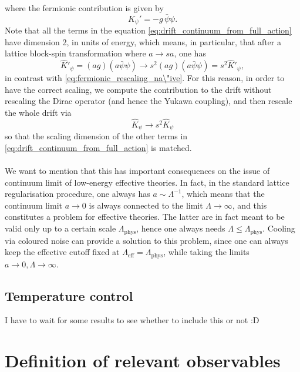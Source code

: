where the fermionic contribution is given by
\begin{equation*}
    K_{\psi}' = - g \, \bar\psi\psi.
\end{equation*}
Note that all the terms in the equation \eqref{eq:drift_continuum_from_full_action} have dimension 2, in units of energy, which means, in particular, that after a lattice block-spin transformation where $a \to sa$, one has
\begin{equation}
    \widehat{K}'_\psi = (ag) (a\bar\psi \psi) \to s^2 (ag) (a\bar\psi \psi) = s^2 \widehat{K}'_\psi,
    \label{eq:rescaling_blinear}
\end{equation}
in contrast with \eqref{eq:fermionic_rescaling_na\"ive}. For this reason, in order to have the correct scaling, we compute the contribution to the drift without rescaling the Dirac operator (and hence the Yukawa coupling), and then rescale the whole drift via 
\begin{equation*}
    \widehat{K}_\psi \to s^2 \widehat{K}_\psi
\end{equation*}
so that the scaling dimension of the other terms in \eqref{eq:drift_continuum_from_full_action} is matched. \\~\\
We want to mention that this has important consequences on the issue of continuum limit of low-energy effective theories. In fact, in the standard lattice regularisation procedure, one always has $a \sim \Lambda^{-1}$, which means that the continuum limit $a \to 0$ is always connected to the limit $\Lambda \to \infty$, and this constitutes a problem for effective theories. The latter are in fact meant to be valid only up to a certain scale $\Lambda_\text{phys}$, hence one always needs $\Lambda \leq \Lambda_\text{phys}$. Cooling via coloured noise can provide a solution to this problem, since one can always keep the effective cutoff fixed at $\Lambda_\text{eff} = \Lambda_\text{phys}$, while taking the limits $a \to 0, \Lambda \to \infty$. 

\subsection*{Temperature control}
I have to wait for some results to see whether to include this or not :D

\section{Definition of relevant observables}